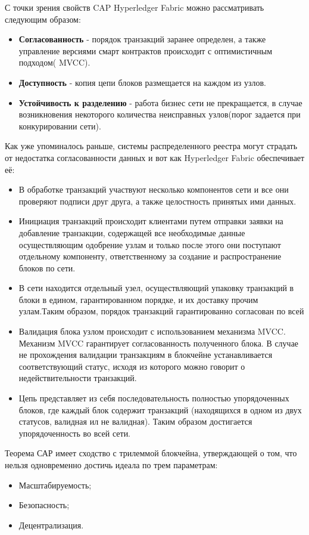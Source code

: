 С точки зрения свойств CAP Hyperledger Fabric можно рассматривать следующим образом:
\begin{itemize}
	\item \textbf{Согласованность} - порядок транзакций заранее определен, а также управление версиями смарт контрактов происходит с оптимистичным подходом( MVCC)\cite{mvcc}.
	\item \textbf{Доступность} - копия цепи блоков размещается на каждом из узлов.
	\item \textbf{Устойчивость к разделению} - работа бизнес сети не прекращается, в случае возникновения некоторого количества неисправных узлов(порог задается при конкурировании сети).
\end{itemize}

Как уже упоминалось раньше, системы распределенного реестра могут страдать от недостатка согласованности данных и вот как Hyperledger Fabric обеспечивает её:
\begin{itemize}
	\item  В обработке транзакций участвуют несколько компонентов сети и все они проверяют подписи друг друга, а также целостность принятых ими данных.
	\item Инициация транзакций происходит клиентами путем отправки заявки на добавление транзакции, содержащей все необходимые данные осуществляющим одобрение узлам и только после этого они поступают отдельному компоненту, ответственному за создание и распространение блоков по сети.
	\item В сети находится отдельный узел, осуществляющий упаковку транзакций в блоки в едином, гарантированном порядке, и их доставку прочим узлам.Таким образом, порядок транзакций гарантированно согласован по всей
	\item Валидация блока узлом происходит с использованием механизма MVCC. Механизм MVCC гарантирует согласованность полученного блока. В случае не прохождения валидации транзакциям в блокчейне устанавливается соответствующий статус, исходя из которого можно говорит о недействительности транзакций.
	\item Цепь представляет из себя последовательность полностью упорядоченных блоков, где каждый блок содержит транзакций (находящихся в одном из двух статусов, валидная ил не валидная). Таким образом достигается упорядоченность во всей сети.
\end{itemize}

Теорема САР имеет сходство с трилеммой блокчейна, утверждающей о том, что нельзя одновременно достичь идеала по трем параметрам:
\begin{itemize}
	\item Масштабируемость;
	\item Безопасность;
	\item Децентрализация.
\end{itemize}

